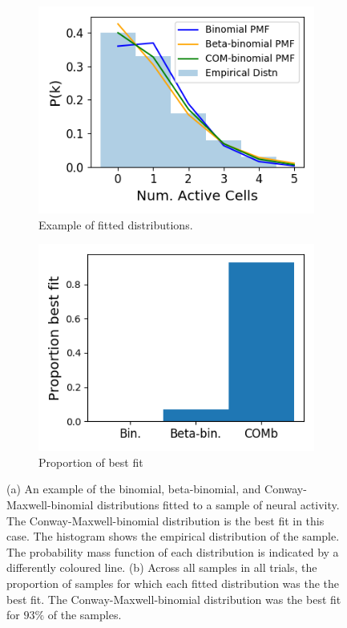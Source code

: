 \documentclass[a4paper,12pt]{article}
\theoremstyle{definition}
\begin{document}
  \newpage

  \begin{figure}[h]
    \begin{subfigure}[h]{0.5\linewidth}
      \includegraphics[width=\linewidth]{figures/fitting_example.png}
      \caption{Example of fitted distributions.}
      \label{fig:fitting_example}
    \end{subfigure}
    \begin{subfigure}[h]{0.5\linewidth}
      \includegraphics[width=\linewidth]{figures/best_fit_proportion.png}
      \caption{Proportion of best fit}
      \label{fig:best_fit_proportion}
    \end{subfigure}
    \caption{(a) An example of the binomial, beta-binomial, and Conway-Maxwell-binomial distributions fitted to a sample of neural activity. The Conway-Maxwell-binomial distribution is the best fit in this case. The histogram shows the empirical distribution of the sample. The probability mass function of each distribution is indicated by a differently coloured line. (b) Across all samples in all trials, the proportion of samples for which each fitted distribution was the the best fit. The Conway-Maxwell-binomial distribution was the best fit for $93\%$ of the samples.}
    \label{fig:fitting}
  \end{figure}
\end{document}
